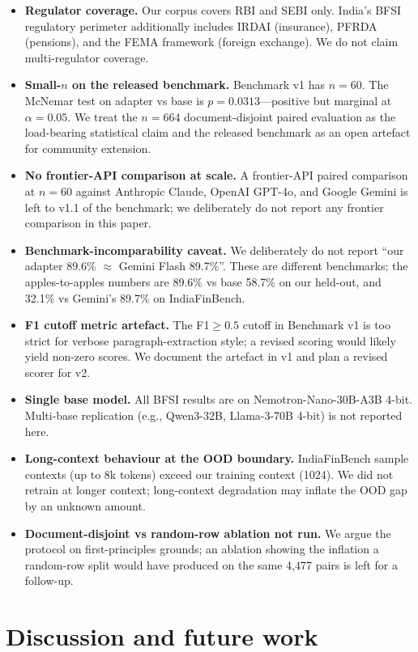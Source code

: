 \documentclass{article}
\begin{document}
\begin{itemize}
  \item \textbf{Regulator coverage.} Our corpus covers RBI and SEBI only. India's BFSI regulatory perimeter additionally includes IRDAI (insurance), PFRDA (pensions), and the FEMA framework (foreign exchange). We do not claim multi-regulator coverage.
  \item \textbf{Small-$n$ on the released benchmark.} Benchmark v1 has $n{=}60$. The McNemar test on adapter vs base is $p{=}0.0313$---positive but marginal at $\alpha{=}0.05$. We treat the $n{=}664$ document-disjoint paired evaluation as the load-bearing statistical claim and the released benchmark as an open artefact for community extension.
  \item \textbf{No frontier-API comparison at scale.} A frontier-API paired comparison at $n{=}60$ against Anthropic Claude, OpenAI GPT-4o, and Google Gemini is left to v1.1 of the benchmark; we deliberately do not report any frontier comparison in this paper.
  \item \textbf{Benchmark-incomparability caveat.} We deliberately do not report ``our adapter 89.6\% $\approx$ Gemini Flash 89.7\%''. These are different benchmarks; the apples-to-apples numbers are 89.6\% vs base 58.7\% on our held-out, and 32.1\% vs Gemini's 89.7\% on IndiaFinBench.
  \item \textbf{F1 cutoff metric artefact.} The F1$\geq0.5$ cutoff in Benchmark v1 is too strict for verbose paragraph-extraction style; a revised scoring would likely yield non-zero scores. We document the artefact in v1 and plan a revised scorer for v2.
  \item \textbf{Single base model.} All BFSI results are on Nemotron-Nano-30B-A3B 4-bit. Multi-base replication (e.g., Qwen3-32B, Llama-3-70B 4-bit) is not reported here.
  \item \textbf{Long-context behaviour at the OOD boundary.} IndiaFinBench sample contexts (up to 8k tokens) exceed our training context (1024). We did not retrain at longer context; long-context degradation may inflate the OOD gap by an unknown amount.
  \item \textbf{Document-disjoint vs random-row ablation not run.} We argue the protocol on first-principles grounds; an ablation showing the inflation a random-row split would have produced on the same 4{,}477 pairs is left for a follow-up.
\end{itemize}

\section{Discussion and future work}
\label{sec:discussion}
\end{document}
